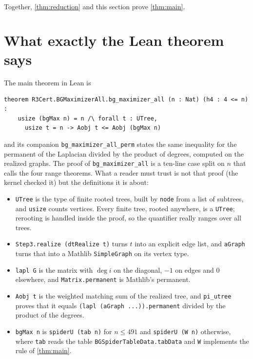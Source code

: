 \documentclass[11pt]{article}
\theoremstyle{definition}
\renewcommand{\deg}{\operatorname{deg}}
\newcommand{\lean}[1]{\texttt{#1}}
\begin{document}
Together, \cref{thm:reduction} and this section prove \cref{thm:main}.

\section{What exactly the Lean theorem says}\label{sec:lean}

The main theorem in Lean is
\begin{verbatim}
theorem R3Cert.BGMaximizerAll.bg_maximizer_all (n : Nat) (h4 : 4 <= n) :
    usize (bgMax n) = n /\ forall t : UTree,
      usize t = n -> Aobj t <= Aobj (bgMax n)
\end{verbatim}
and its companion \lean{bg\_maximizer\_all\_perm} states the same inequality for the permanent of the
Laplacian divided by the product of degrees, computed on the realized graphs. The proof of
\lean{bg\_maximizer\_all} is a ten-line case split on $n$ that calls the four range theorems. What a
reader must trust is not that proof (the kernel checked it) but the definitions it is about:

\begin{itemize}
\item \lean{UTree} is the type of finite rooted trees, built by \lean{node} from a list of subtrees, and
  \lean{usize} counts vertices. Every finite tree, rooted anywhere, is a \lean{UTree}; rerooting is
  handled inside the proof, so the quantifier really ranges over all trees.
\item \lean{Step3.realize (dtRealize t)} turns $t$ into an explicit edge list, and \lean{aGraph} turns
  that into a Mathlib \lean{SimpleGraph} on its vertex type.
\item \lean{lapl G} is the matrix with $\deg i$ on the diagonal, $-1$ on edges and $0$ elsewhere, and
  \lean{Matrix.permanent} is Mathlib's permanent.
\item \lean{Aobj t} is the weighted matching sum of the realized tree, and \lean{pi\_utree} proves that
  it equals \lean{(lapl (aGraph ...)).permanent} divided by the product of the degrees.
\item \lean{bgMax n} is \lean{spiderU (tab n)} for $n\le491$ and \lean{spiderU (W n)} otherwise, where
  \lean{tab} reads the table \lean{BGSpiderTableData.tabData} and \lean{W} implements the rule of
  \cref{thm:main}.
\end{itemize}
\end{document}
